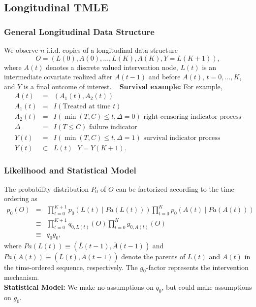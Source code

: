 \documentclass[t]{beamer}
\begin{document}
\subsection{Longitudinal TMLE}

\begin{frame}
\frametitle{General Longitudinal Data Structure}
We observe $n$ i.i.d. copies of a longitudinal data structure
\[
O=(L(0),A(0),\ldots,L(K),A(K),Y=L(K+1)),\]
where $A(t)$ denotes a discrete valued intervention node,  $L(t)$ is an intermediate covariate realized after 
$A(t-1)$ and  before $A(t)$, $t=0,\ldots,K$, and $Y$ is a final outcome of interest.
\ \newline
{\bf Survival example:}
For example, 
\begin{eqnarray*}
A(t)&=&(A_1(t),A_2(t))\\
A_1(t)&=& I(\mbox{Treated at time $t$})\\
A_2(t)&=& I(\min(T,C)\leq t,\Delta=0)\mbox{ right-censoring indicator process}\\
\Delta&=&I(T\leq C)\mbox{ failure indicator}\\
Y(t)&=&I(\min(T,C)\leq t,\Delta=1)\mbox{ survival indicator process}\\
Y(t)&\subset& L(t)\mbox{ $Y=Y(K+1)$}.
\end{eqnarray*}
\end{frame}

\begin{frame}
\frametitle{Likelihood and Statistical Model}
The probability distribution $P_0$ of $O$ can be factorized according to the time-ordering as 
\begin{eqnarray*}
p_0(O)&=&\prod_{t=0}^{K+1} p_0(L(t)\mid Pa(L(t)) ) \prod_{t=0}^K p_0(A(t)\mid Pa(A(t)) )\\
&\equiv& \prod_{t=0}^{K+1}q_{0,L(t)}(O)\prod_{t=0}^K g_{0,A(t)}(O)\\
&\equiv& q_0g_0,
\end{eqnarray*}
where $Pa(L(t))\equiv (\bar{L}(t-1),\bar{A}(t-1))$ and $Pa(A(t))\equiv (\bar{L}(t),\bar{A}(t-1))$ denote the parents  of $L(t)$ and $A(t)$ in the time-ordered sequence, respectively. 
The $g_0$-factor represents the intervention mechanism.\\
{\bf Statistical Model:}
We make no assumptions on $q_0$, but could make assumptions on $g_0$.
\end{frame}
\end{document}
